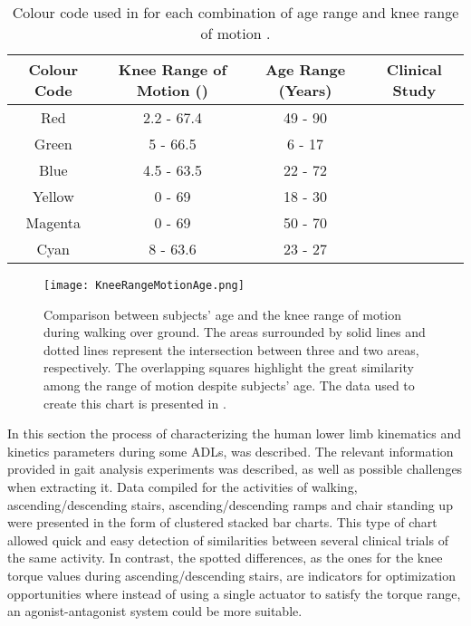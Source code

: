 \begin{table}[htb!]
\caption{Colour code used in  for each combination of age range and knee range of motion  \cite{solis2017characterization}.}
\label{tbl:KneeRangeMotionage}
\begin{tabular}{c|c|c|c}
\hline
Colour Code & Knee Range of Motion (\degree{}) & Age Range (Years) & Clinical Study \\
\hline
Red         & 2.2 - 67.4               & 49 - 90           & \cite{rowe2000knee}       \\
Green       & 5 - 66.5                 & 6 - 17            & \cite{bovi2011multiple}        \\
Blue        & 4.5 - 63.5               & 22 - 72           & \cite{bovi2011multiple}           \\
Yellow      & 0 - 69                   & 18 - 30           & \cite{lee2008biomechanics}        \\
Magenta     & 0 - 69                   & 50 - 70           & \cite{lee2008biomechanics}     \\
Cyan        & 8 - 63.6                 & 23 - 27           & \cite{han2011biomechanical}    \\  
\hline
\end{tabular}
\end{table}

\begin{figure}[htb!]
    \centering
    \texttt{[image: KneeRangeMotionAge.png]}
    \caption{Comparison between subjects' age and the knee range of motion during walking over ground. The areas surrounded by solid lines and dotted lines represent the intersection between three and two areas, respectively. The overlapping squares highlight the great similarity among the range of motion despite subjects' age. The data used to create this chart is presented in  \cite{solis2017characterization}. }
    \label{fig:KneeRangeAge}
\end{figure}

In this section the process of characterizing the human lower limb kinematics and kinetics parameters during some ADLs, was described. The relevant information provided in gait analysis experiments was described, as well as possible challenges when extracting it. Data compiled for the activities of walking, ascending/descending stairs, ascending/descending ramps and chair standing up were presented in the form of clustered stacked bar charts. This type of chart allowed quick and easy detection of similarities between several clinical trials of the same activity. In contrast, the spotted differences, as the ones for the knee torque values during ascending/descending stairs, are indicators for optimization opportunities where instead of using a single actuator to satisfy the torque range, an agonist-antagonist system could be more suitable.

